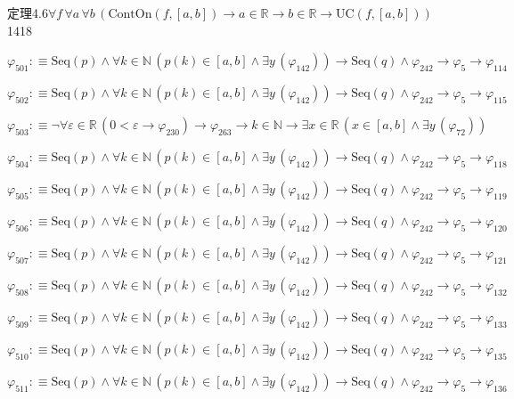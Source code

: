 \begin{fullproof}{定理4.6}{$\forall f\,\forall a\,\forall b\,(\mathrm{ContOn}(f,[a,b]) \to a \in \mathbb{R} \to b \in \mathbb{R} \to \mathrm{UC}(f,[a,b]))$}{1418}
\begin{abbrevlist}
\item $\varphi_{501} :\equiv \mathrm{Seq}(p) \land \forall k \in \mathbb{N}\,(p(k) \in [a,b] \land \exists y\,(\varphi_{142})) \to \mathrm{Seq}(q) \land \varphi_{242} \to \varphi_{5} \to \varphi_{114}$
\item $\varphi_{502} :\equiv \mathrm{Seq}(p) \land \forall k \in \mathbb{N}\,(p(k) \in [a,b] \land \exists y\,(\varphi_{142})) \to \mathrm{Seq}(q) \land \varphi_{242} \to \varphi_{5} \to \varphi_{115}$
\item $\varphi_{503} :\equiv \neg \forall \varepsilon \in \mathbb{R}\,(0 < \varepsilon \to \varphi_{230}) \to \varphi_{263} \to k \in \mathbb{N} \to \exists x \in \mathbb{R}\,(x \in [a,b] \land \exists y\,(\varphi_{72}))$
\item $\varphi_{504} :\equiv \mathrm{Seq}(p) \land \forall k \in \mathbb{N}\,(p(k) \in [a,b] \land \exists y\,(\varphi_{142})) \to \mathrm{Seq}(q) \land \varphi_{242} \to \varphi_{5} \to \varphi_{118}$
\item $\varphi_{505} :\equiv \mathrm{Seq}(p) \land \forall k \in \mathbb{N}\,(p(k) \in [a,b] \land \exists y\,(\varphi_{142})) \to \mathrm{Seq}(q) \land \varphi_{242} \to \varphi_{5} \to \varphi_{119}$
\item $\varphi_{506} :\equiv \mathrm{Seq}(p) \land \forall k \in \mathbb{N}\,(p(k) \in [a,b] \land \exists y\,(\varphi_{142})) \to \mathrm{Seq}(q) \land \varphi_{242} \to \varphi_{5} \to \varphi_{120}$
\item $\varphi_{507} :\equiv \mathrm{Seq}(p) \land \forall k \in \mathbb{N}\,(p(k) \in [a,b] \land \exists y\,(\varphi_{142})) \to \mathrm{Seq}(q) \land \varphi_{242} \to \varphi_{5} \to \varphi_{121}$
\item $\varphi_{508} :\equiv \mathrm{Seq}(p) \land \forall k \in \mathbb{N}\,(p(k) \in [a,b] \land \exists y\,(\varphi_{142})) \to \mathrm{Seq}(q) \land \varphi_{242} \to \varphi_{5} \to \varphi_{132}$
\item $\varphi_{509} :\equiv \mathrm{Seq}(p) \land \forall k \in \mathbb{N}\,(p(k) \in [a,b] \land \exists y\,(\varphi_{142})) \to \mathrm{Seq}(q) \land \varphi_{242} \to \varphi_{5} \to \varphi_{133}$
\item $\varphi_{510} :\equiv \mathrm{Seq}(p) \land \forall k \in \mathbb{N}\,(p(k) \in [a,b] \land \exists y\,(\varphi_{142})) \to \mathrm{Seq}(q) \land \varphi_{242} \to \varphi_{5} \to \varphi_{135}$
\item $\varphi_{511} :\equiv \mathrm{Seq}(p) \land \forall k \in \mathbb{N}\,(p(k) \in [a,b] \land \exists y\,(\varphi_{142})) \to \mathrm{Seq}(q) \land \varphi_{242} \to \varphi_{5} \to \varphi_{136}$

\end{abbrevlist}
\end{fullproof}

